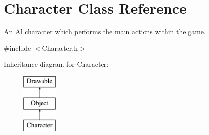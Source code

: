 \hypertarget{class_character}{}\section{Character Class Reference}
\label{class_character}


An AI character which performs the main actions within the game.  




{\ttfamily \#include $<$Character.\+h$>$}

Inheritance diagram for Character\+:\begin{figure}[H]
\begin{center}
\leavevmode
\includegraphics[height=3.000000cm]{class_character}
\end{center}
\end{figure}
